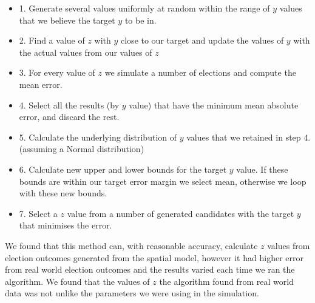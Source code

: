 \documentclass{article}
\begin{document}
\begin{itemize}
\item 1. Generate several values uniformly at random within the range of $y$ values that we believe the target $y$ to be in.
\item 2. Find a value of $z$ with $y$ close to our target and update the values of $y$ with the actual values from our values of $z$
\item 3. For every value of $z$ we simulate a number of elections and compute the mean error.
\item 4. Select all the results (by $y$ value) that have the minimum mean absolute error, and discard the rest.
\item 5. Calculate the underlying distribution of $y$ values that we retained in step 4. (assuming a Normal distribution)
\item 6. Calculate new upper and lower bounds for the target $y$ value. If these bounds are within our target error margin we select mean, otherwise we loop with these new bounds.
\item 7. Select a $z$ value from a number of generated candidates with the target $y$ that minimises the error.
\end{itemize}

We found that this method can, with reasonable accuracy, calculate $z$ values from election outcomes generated from the spatial model, however it had higher error from real world election outcomes and the results varied each time we ran the algorithm. We found that the values of $z$ the algorithm found from real world data was not unlike the parameters we were using in the simulation.




\end{document}
